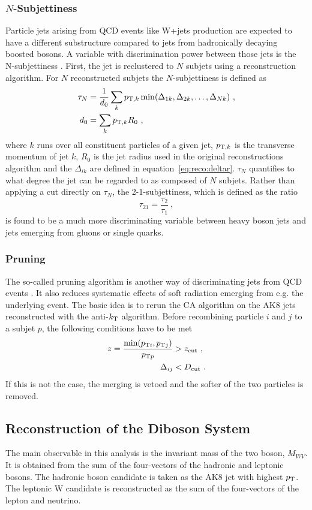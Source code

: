 \subsubsection*{$N$-Subjettiness}
Particle jets arising from QCD events like W+jets production are expected to have a different substructure compared to jets from hadronically decaying boosted bosons. A variable with discrimination power between those jets is the N-subjettiness \cite{nsubjettiness}. First, the jet is reclustered to $N$ subjets using a reconstruction algorithm. For $N$ reconstructed subjets the $N$-subjettiness is defined as
\begin{align}
\tau_N &= \frac{1}{d_0} \sum_k p_{{\rm T},k} \min(\Delta_{1k},\Delta_{2k},\dots,\Delta_{Nk}) ~, \\
d_0 &= \sum_k p_{{\rm T},k} R_0 ~,
\end{align}
where $k$ runs over all constituent particles of a given jet, $p_{{\rm T},k}$ is the transverse momentum of jet $k$, $R_0$ is the jet radius used in the original reconstructions algorithm and the $\Delta_{ik}$ are defined in equation~\ref{eq:reco:deltar}. $\tau_N$ quantifies to what degree the jet can be regarded to as composed of $N$ subjets. Rather than applying a cut directly on $\tau_N$, the 2-1-subjettiness, which is defined as the ratio
\begin{equation}
\tau_{21}=\frac{\tau_2}{\tau_1} ~,
\end{equation}
is found to be a much more discriminating variable between heavy boson jets and jets emerging from gluons or single quarks.
\subsubsection*{Pruning}
The so-called pruning algorithm is another way of discriminating jets from QCD events \cite{pruning}. It also reduces systematic effects of soft radiation emerging from e.g. the underlying event. The basic idea is to rerun the CA algorithm on the AK8 jets reconstructed with the anti-$k_{\rm T}$ algorithm. Before recombining particle $i$ and $j$ to a subjet $p$, the following conditions have to be met
\begin{align}
z = \frac{\min (p_{{\rm T}i},p_{{\rm T}j})}{p_{{\rm T}p}} &> z_{\rm cut} ~, \\
\Delta_{ij} &< D_{\rm cut} ~.
\end{align}
If this is not the case, the merging is vetoed and the softer of the two particles is removed.
\subsection{Reconstruction of the Diboson System}
The main observable in this analysis is the invariant mass of the two boson, $M_{WV}$. It is obtained from the sum of the four-vectors of the hadronic and leptonic bosons. The hadronic boson candidate is taken as the AK8 jet with highest $p_{\rm T}$. The leptonic W candidate is reconstructed as the sum of the four-vectors of the lepton and neutrino. 
